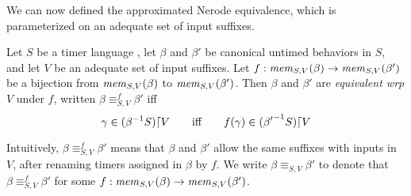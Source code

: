 



We can now defined the approximated Nerode equivalence, which is parameterized
on an adequate set of input suffixes.

\begin{definition}
  \label{def:approx-nerode}
Let $S$ be a timer language ,
let $\beta$ and $\beta'$ be canonical untimed behaviors in $S$,
and let  $V$ be an adequate set of input suffixes.
Let $f : \apprgetmemorable{S}{\beta}{V} \to \apprgetmemorable{S}{\beta'}{V}$
be a bijection
from $\apprgetmemorable{S}{\beta}{V}$ to $\apprgetmemorable{S}{\beta'}{V}$.
Then $\beta$ and $\beta'$ are \emph{equivalent wrp $V$} under $f$, written
$\beta \equiv_{S,V}^f \beta'$ iff
\[
\gamma \in \apprsuffixbehs{S}{\beta}{V}
\qquad \mbox{iff} \qquad
f(\gamma) \in \apprsuffixbehs{S}{\beta'}{V}
\]
\end{definition}
Intuitively, $\beta \equiv_{S,V}^f \beta'$ means that $\beta$ and $\beta'$
allow the same suffixes with inputs in $V$, after renaming
timers assigned in $\beta$ by $f$.
We write $\beta \equiv_{S,V} \beta'$ to denote that
$\beta \equiv_{S,V}^f \beta'$ for some
$f : \apprgetmemorable{S}{\beta}{V} \to \apprgetmemorable{S}{\beta'}{V}$.



